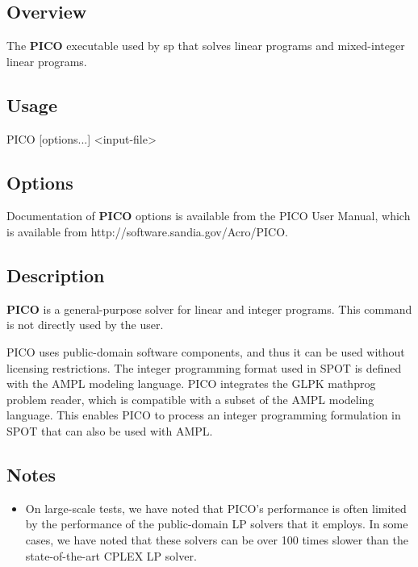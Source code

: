 \subsection{Overview}\label{picoExecutable_picoOverview}
The {\bfseries PICO} executable used by {\ttfamily sp} that solves linear programs and mixed-\/integer linear programs.
\subsection{Usage}\label{picoExecutable_picoUsage}
\begin{verb}
   PICO [options...] <input-file>
\end{verb}
\subsection{Options}\label{picoExecutable_picoOptions}
Documentation of {\bfseries PICO} options is available from the PICO User Manual, which is available from   
http://software.sandia.gov/Acro/PICO.
\subsection{Description}\label{picoExecutable_picoDescription}
{\bfseries PICO} is a general-\/purpose solver for linear and integer programs. This command is not directly used by the user.

PICO uses public-\/domain software components, and thus it can be used without licensing restrictions. The integer programming format used in SPOT is defined with the AMPL modeling language. PICO integrates the GLPK mathprog problem reader, which is compatible with a subset of the AMPL modeling language. This enables PICO to process an integer programming formulation in SPOT that can also be used with AMPL.
\subsection{Notes}\label{picoExecutable_picoNotes}

\begin{itemize}
\item On large-\/scale tests, we have noted that PICO's performance is often limited by the performance of the public-\/domain LP solvers that it employs. In some cases, we have noted that these solvers can be over 100 times slower than the state-\/of-\/the-\/art CPLEX LP solver. 
\end{itemize}
